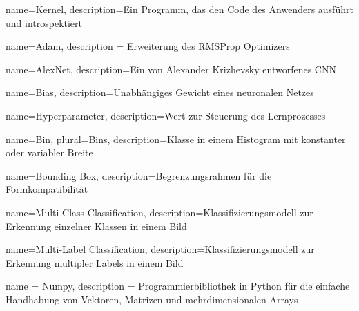 
%
%

%
%

	{name={Kernel}, 
	description={Ein Programm, das den Code des Anwenders ausführt und introspektiert}
	}
	
	{name={Adam},
	description = {Erweiterung des RMSProp Optimizers}
	}
	
	{name={AlexNet}, 
	description={Ein von Alexander Krizhevsky entworfenes \ac{CNN}}
	}

	{name={Bias}, 
	description={Unabhängiges Gewicht eines neuronalen Netzes}
	}
	
	{name={Hyperparameter},
	description={Wert zur Steuerung des Lernprozesses}
	}

	{
	name={Bin},
	plural={Bins},
	description={Klasse in einem Histogram mit konstanter oder variabler Breite}
	}
	
	{
	name={Bounding Box},
	description={Begrenzungsrahmen für die Formkompatibilität}
	}
	
	{
	name={Multi-Class Classification},
	description={Klassifizierungsmodell zur Erkennung einzelner Klassen in einem Bild}
	}
	
	{
	name={Multi-Label Classification},
	description={Klassifizierungsmodell zur Erkennung multipler Labels in einem Bild}
	}
	
	{
	name = {Numpy},
	description = {Programmierbibliothek in Python für die einfache Handhabung von Vektoren, Matrizen und mehrdimensionalen Arrays}
	}
